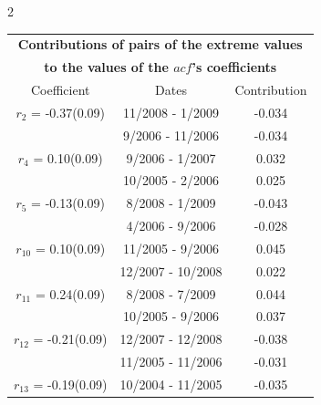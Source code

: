 
\thispagestyle{empty}
\begin{multicols}{2}{ 
\begin{tabular}{ccc}
\multicolumn{3}{c}{\textbf{Contributions of pairs of the extreme values} }  \vspace{-.10in}  \\ 
\multicolumn{3}{c}{ \textbf{to the values of the $acf$'s coefficients}} \\ 
\hline 
\hline                  Coefficient  &  Dates &  Contribution \\ 
\hline 
  $r_{ 2}$ = -0.37(0.09) &      11/2008 -  1/2009 &       -0.034    \vspace{-.10in} \\ 
  &        9/2006 - 11/2006 &       -0.034  \vspace{-.02in}   \\ \hline 
    $r_{ 4}$ = 0.10(0.09) &       9/2006 -  1/2007 &        0.032   \vspace{-.10in} \\  
&       10/2005 -  2/2006 &        0.025  \vspace{-.02in} \\ \hline 
  $r_{ 5}$ = -0.13(0.09) &       8/2008 -  1/2009 &       -0.043    \vspace{-.10in} \\ 
  &        4/2006 -  9/2006 &       -0.028  \vspace{-.02in}   \\ \hline 
    $r_{10}$ = 0.10(0.09) &      11/2005 -  9/2006 &        0.045   \vspace{-.10in} \\  
&       12/2007 - 10/2008 &        0.022  \vspace{-.02in} \\ \hline 
  $r_{11}$ = 0.24(0.09) &       8/2008 -  7/2009 &        0.044   \vspace{-.10in} \\  
&       10/2005 -  9/2006 &        0.037  \vspace{-.02in} \\ \hline 
  $r_{12}$ = -0.21(0.09) &      12/2007 - 12/2008 &       -0.038    \vspace{-.10in} \\ 
  &       11/2005 - 11/2006 &       -0.031  \vspace{-.02in}   \\ \hline 
    $r_{13}$ = -0.19(0.09) &      10/2004 - 11/2005 &       -0.035    \vspace{-.10in} \\ 

\end{tabular}}
\end{multicols}
